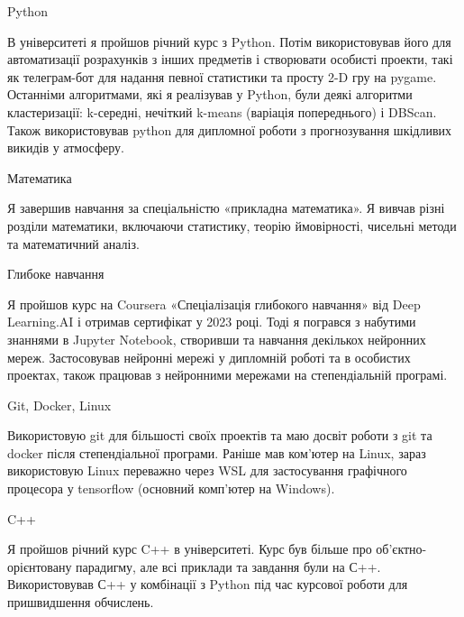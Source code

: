 \documentclass[10pt, letterpaper]{article}
\begin{document}
            
        \begin{onecolentry}
            \begin{highlightsforbulletentries}


            \item Python


            В університеті я пройшов річний курс з Python. 
            Потім використовував його для автоматизації розрахунків з інших предметів і створювати особисті проекти, такі як телеграм-бот для надання певної статистики та просту 2-D гру на pygame. Останніми алгоритмами, які я реалізував у Python, були деякі алгоритми кластеризації: k-середні, нечіткий k-means (варіація попереднього) і DBScan. 
            Також використовував python для дипломної роботи з прогнозування шкідливих викидів у атмосферу. 

            \item Математика
            

            Я завершив навчання за спеціальністю «прикладна математика». 
            Я вивчав різні розділи математики, включаючи статистику, теорію ймовірності, чисельні методи та математичний аналіз. 


            \item Глибоке навчання 
            

            Я пройшов курс на Coursera «Спеціалізація глибокого навчання» від Deep Learning.AI і отримав сертифікат у 2023 році. 
            Тоді я погрався з набутими знаннями в Jupyter Notebook, створивши та навчання декількох нейронних мереж. 
            Застосовував нейронні мережі у дипломній роботі та в особистих проектах, також працював з нейронними мережами на степендіальній програмі.

            \item Git, Docker, Linux
            

            Використовую git для більшості своїх проектів та маю досвіт роботи з git та docker після степендіальної програми. 
            Раніше мав ком'ютер на Linux, зараз використовую Linux переважно через WSL для застосування графічного процесора у tensorflow (основний комп'ютер на Windows).
            
            
            \item C++
            

            Я пройшов річний курс C++ в університеті. 
            Курс був більше про об'єктно-орієнтовану парадигму, але всі приклади та завдання були на С++. Використовував С++ у комбінації з Python під час курсової роботи для пришвидшення обчислень.



\end{highlightsforbulletentries}
\end{onecolentry}
\end{document}
